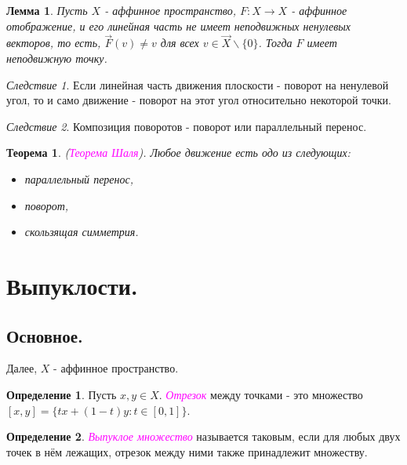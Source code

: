 \documentclass[a4paper,100pt]{article}
\theoremstyle{indented}
\newtheorem{theorem}{Теорема}
\newtheorem{lemma}{Лемма}
\theoremstyle{definition}
\newtheorem{defn}{Определение}
\theoremstyle{remark}
\newtheorem{cons}{Следствие}
\DeclareMathOperator{\ra}{\rightarrow}
\begin{document}
\begin{lemma}
    Пусть $X$ - аффинное пространство, $F:X\ra X$ - аффинное отображение, и его линейная часть не имеет неподвижных ненулевых векторов, то есть, $\vec{F}(v)\neq v$ для всех $v\in \vec{X}\backslash \{0\}$. Тогда $F$ имеет неподвижную точку. 
\end{lemma}

\begin{cons}
    Если линейная часть движения плоскости - поворот на ненулевой угол, то и само движение - поворот на этот угол относительно некоторой точки.
\end{cons}

\begin{cons}
    Композиция поворотов - поворот или параллельный перенос.
\end{cons}

\begin{theorem}
    (\textit{\textcolor{magenta}{\hypertarget{s87}{Теорема Шаля}}}). Любое движение есть одо из следующих: 

    \begin{itemize}
        \item параллельный перенос,
        \item поворот, 
        \item скользящая симметрия.
    \end{itemize}
\end{theorem}

\section{Выпуклости.}

\subsection{Основное.}

Далее, $X$ - аффинное пространство.

\begin{defn}
    Пусть $x, y \in X$. \textit{\textcolor{magenta}{\hypertarget{s88}{Отрезок}}} между точками - это множество $[x, y] = \{tx+(1-t)y : t\in [0, 1]\}$. 
\end{defn}

\begin{defn}
    \textit{\textcolor{magenta}{\hypertarget{s89}{Выпуклое множество}}} называется таковым, если для любых двух точек в нём лежащих, отрезок между ними также принадлежит множеству.
\end{defn}
\end{document}
